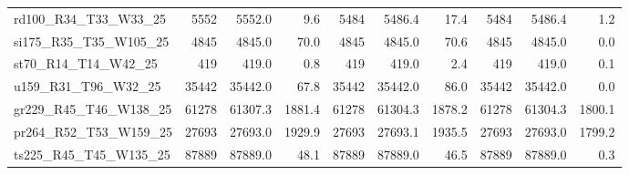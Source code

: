 \documentclass{singlecol-new}
\theoremstyle{TH}{
\newtheorem{lemma}{Lemma}
\newtheorem{theorem}[lemma]{Theorem}
\newtheorem{corrolary}[lemma]{Corrolary}
\newtheorem{conjecture}[lemma]{Conjecture}
\newtheorem{proposition}[lemma]{Proposition}
\newtheorem{claim}[lemma]{Claim}
\newtheorem{stheorem}[lemma]{Wrong Theorem}
}
\theoremstyle{THrm}{
\newtheorem{definition}{Definition}[section]
\newtheorem{question}{Question}[section]
\newtheorem{remark}{Remark}
\newtheorem{scheme}{Scheme}
}
\theoremstyle{THhit}{
\newtheorem{case}{Case}[section]
}
\begin{document}
\begin{table}[h]
{\begin{tabular}{lrrrrrrrrr}
rd100\_R34\_T33\_W33\_25    & 5552    & 5552.0    & 9.6     & 5484    & 5486.4    & 17.4     & 5484    & 5486.4    & 1.2      \\
si175\_R35\_T35\_W105\_25   & 4845    & 4845.0    & 70.0    & 4845    & 4845.0    & 70.6     & 4845    & 4845.0    & 0.0      \\
st70\_R14\_T14\_W42\_25     & 419     & 419.0     & 0.8     & 419     & 419.0     & 2.4      & 419     & 419.0     & 0.1      \\
u159\_R31\_T96\_W32\_25     & 35442   & 35442.0   & 67.8    & 35442   & 35442.0   & 86.0     & 35442   & 35442.0   & 0.0      \\
gr229\_R45\_T46\_W138\_25   & 61278   & 61307.3   & 1881.4  & 61278   & 61304.3   & 1878.2   & 61278   & 61304.3   & 1800.1   \\
pr264\_R52\_T53\_W159\_25   & 27693   & 27693.0   & 1929.9  & 27693   & 27693.1   & 1935.5   & 27693   & 27693.0   & 1799.2   \\
ts225\_R45\_T45\_W135\_25   & 87889   & 87889.0   & 48.1    & 87889   & 87889.0   & 46.5     & 87889   & 87889.0   & 0.3     \\
\hline
\end{tabular}%
}
\end{table}
\end{document}
